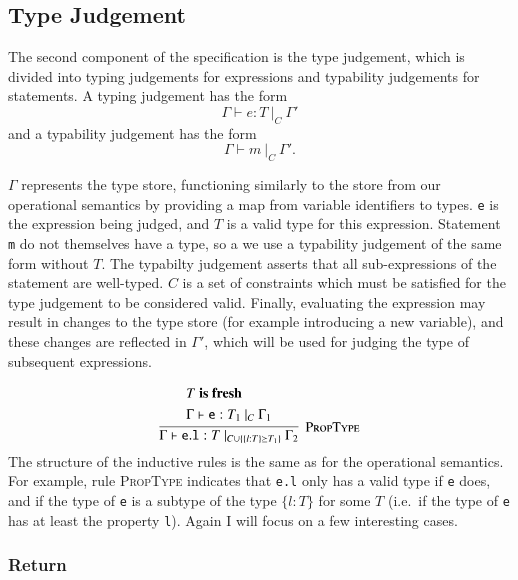 \documentclass[12pt,a4paper,twoside,openright]{report}
\newcommand*{\js}{\texttt}
\begin{document}
\subsection{Type Judgement}
The second component of the specification is the type judgement, which is
divided into typing judgements for expressions and typability judgements for
statements. A typing judgement has the form $$\Gamma\vdash e : T\ |_C\
\Gamma'$$ and a typability judgement has the form $$\Gamma \vdash m\ |_C\
\Gamma'.$$

$\Gamma$ represents the type store, functioning similarly to the store from our
operational semantics by providing a map from variable identifiers to types.
\js{e} is the expression being judged, and $T$ is a valid type for this
expression. Statement \js{m} do not themselves have a type, so a we use a
typability judgement of the same form without $T$. The typabilty judgement
asserts that all sub-expressions of the statement are well-typed. $C$ is a set
of constraints which must be satisfied for the type judgement to be considered
valid. Finally, evaluating the expression may result in changes to the type store (for
example introducing a new variable), and these changes are reflected in
$\Gamma'$, which will be used for judging the type of subsequent expressions.

$$\infer[\textsc{PropType}]{
	\Gamma \vdash \mathtt{e.l}:T\ |_{C\cup\{\{l:T\}\succeq T_1\}}\ \Gamma_2
}{\begin{split}
	&T \textbf{ is fresh} \\
	&\Gamma\vdash\mathtt{e}:T_1\ |_C\ \Gamma_1
  \end{split}}$$
The structure of the inductive rules is the same as for the operational
semantics. For example, rule \textsc{PropType} indicates that \js{e.l} only
has a valid type if \js{e} does, and if the type of \js{e} is a subtype
of the type $\{l: T\}$ for some $T$ (i.e.~if the type of \js{e} has at least the property
\js{l}). Again I will focus on a few interesting cases.

\subsubsection{Return}
\end{document}
